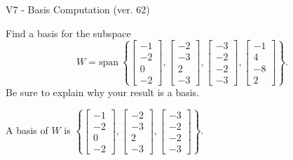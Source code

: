 \begin{exercise}
  \begin{exerciseTitle}V7 - Basis Computation (ver. 62)\end{exerciseTitle}
  \begin{exerciseStatement}
    Find a basis for the subspace 
\[W=\mathrm{span}\ \left\{\left[\begin{array}{r}
-1 \\
-2 \\
0 \\
-2
\end{array}\right] , \left[\begin{array}{r}
-2 \\
-3 \\
2 \\
-3
\end{array}\right] , \left[\begin{array}{r}
-3 \\
-2 \\
-2 \\
-3
\end{array}\right] , \left[\begin{array}{r}
-1 \\
4 \\
-8 \\
2
\end{array}\right]\right\}.\]
 Be sure to explain why your result is a basis.


  \end{exerciseStatement}
  \begin{exerciseAnswer}
   A basis of \(W\) is  \(\left\{\left[\begin{array}{r}
-1 \\
-2 \\
0 \\
-2
\end{array}\right] , \left[\begin{array}{r}
-2 \\
-3 \\
2 \\
-3
\end{array}\right] , \left[\begin{array}{r}
-3 \\
-2 \\
-2 \\
-3
\end{array}\right]\right\}\).
  


  \end{exerciseAnswer}
\end{exercise}
